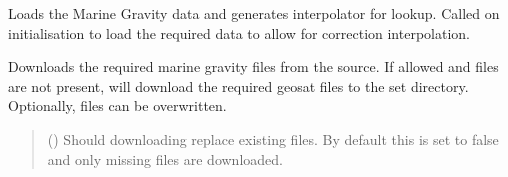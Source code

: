 \documentclass[letterpaper,10pt,english]{sphinxmanual}
\begin{document}
\begin{fulllineitems}
\begin{fulllineitems}
\label{\detokenize{modules/gravity/marine:qnav.gravity.marine.MarineGravity.load_data}}
\pysigstartsignatures
{}
\pysigstopsignatures
\sphinxAtStartPar
Loads the Marine Gravity data and generates interpolator for look\sphinxhyphen{}up.
Called on initialisation to load the required data to allow for
correction interpolation.

\end{fulllineitems}


\begin{fulllineitems}
\label{\detokenize{modules/gravity/marine:qnav.gravity.marine.MarineGravity.download_data}}
\pysigstartsignatures
{}
\pysigstopsignatures
\sphinxAtStartPar
Downloads the required marine gravity files from the source.
If allowed and files are not present, will download the required
geosat files to the set directory. Optionally, files can be
overwritten.
\begin{quote}\begin{description}
\sphinxAtStartPar
{} () \textendash{} Should downloading replace existing files.
By default this is set to false and only missing files
are downloaded.

\end{description}\end{quote}

\end{fulllineitems}


\end{fulllineitems}

\end{document}
